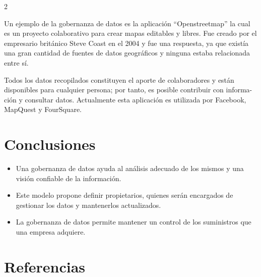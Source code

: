 \documentclass[12pt,spanish,Letterpaper,openany]{book}
\begin{document}
\begin {multicols}{2}
\begin {flushleft}
\begin{minipage}[c]{\columnwidth}
\end{minipage}

\end {flushleft}

Un ejemplo de la gobernanza de datos es la aplicación ``Openstreetmap'' la cual es un proyecto colaborativo para crear mapas editables y libres. Fue creado por el empresario británico Steve Coast en el 2004 y fue una respuesta, ya que existía una gran cantidad de fuentes de datos geográficos y ninguna estaba relacionada entre sí.

Todos los datos recopilados constituyen el aporte de colaboradores y están disponibles para cualquier persona; por tanto, es posible contribuir con informa-
ción y consultar datos. Actualmente esta aplicación es utilizada por Facebook, MapQuest y FourSquare.

\hypertarget{conclusiones-2}{%
\section{Conclusiones}\label{conclusiones-2}}

\begin{itemize}
\item
  Una gobernanza de datos ayuda al análisis adecuado de los mismos y una visión confiable de la información.
\item
  Este modelo propone definir propietarios, quienes serán encargados de gestionar los datos y mantenerlos actualizados.
\item
  La gobernanza de datos permite mantener un control de los suministros que una empresa adquiere.
\end{itemize}

\hypertarget{referencias-1}{%
\section{Referencias}\label{referencias-1}}


\end{multicols}
\end{document}
